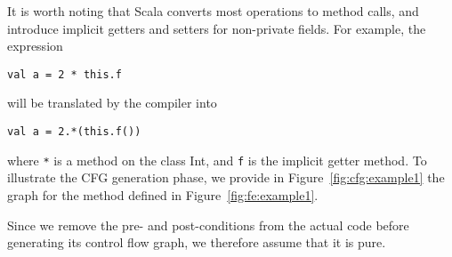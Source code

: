 It is worth noting that Scala converts most operations to method calls, and
introduce implicit getters and setters for non-private fields.  For example,
the expression 
\begin{lstlisting}
val a = 2 * this.f
\end{lstlisting}
will be translated by the compiler into 
\begin{lstlisting}
val a = 2.*(this.f())
\end{lstlisting}
where \verb/*/ is a method on the class Int, and \verb/f/ is the implicit
getter method. To illustrate the CFG generation phase, we provide in
Figure~\ref{fig:cfg:example1} the graph for the method defined in
Figure~\ref{fig:fe:example1}.

Since we remove the pre- and post-conditions from the actual code before
generating its control flow graph, we therefore assume that it is pure.
